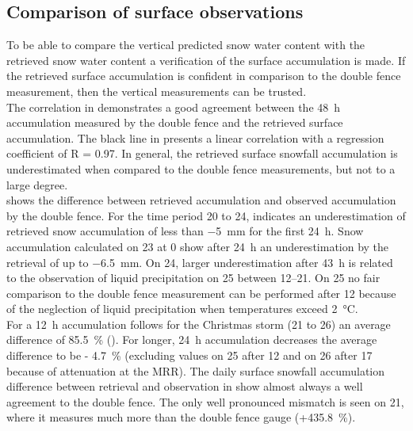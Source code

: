 %

\subsection{Comparison of surface observations} \label{sec:ret_dofe_comp}
To be able to compare the vertical predicted snow water content with the retrieved snow water content a verification of the surface accumulation is made. If the retrieved surface accumulation is confident in comparison to the double fence measurement, then the vertical measurements can be trusted.
\\
The correlation in  demonstrates a good agreement between the \SI{48}{\hour} accumulation measured by the double fence and the retrieved surface accumulation.
The black line in  presents a linear correlation with a regression coefficient of R = \num{0.97}. 
In general, the retrieved surface snowfall accumulation is underestimated when compared to the double fence measurements, but not to a large degree. 
\\
 shows the difference between retrieved accumulation and observed accumulation by the double fence. For the time period \num{20} to \SI{24}{\dec},  indicates an underestimation of retrieved snow accumulation of less than \SI{-5}{\mm} for the first \SI{24}{\hour}. 
Snow accumulation calculated on \SI{23}{\dec} at \SI{0}{\UTC} show after \SI{24}{\hour} an underestimation by the retrieval of up to \SI{-6.5}{\mm}. On \SI{24}{\dec}, larger underestimation after \SI{43}{\hour} is related to the observation of liquid precipitation on \SI{25}{\dec} between \SIrange{12}{21}{\UTC}. On \SI{25}{\dec} no fair comparison to the double fence measurement can be performed after \SI{12}{\UTC} because of the neglection of liquid precipitation when temperatures exceed \SI{2}{\celsius}.
\\
For a \SI{12}{\hour} accumulation follows for the Christmas storm (\num{21} to \SI{26}{\dec}) an average difference of \SI{85.5}{\percent} (). For longer, \SI{24}{\hour} accumulation decreases the average difference to be \SI{- 4.7}{\percent} (excluding values on \SI{25}{\dec} after \SI{12}{\UTC} and on \SI{26}{\dec} after \SI{17}{\UTC} because of attenuation at the MRR). The daily surface snowfall accumulation difference between retrieval and observation in  show almost always a well agreement to the double fence. The only well pronounced mismatch is seen on \SI{21}{\dec}, where it measures much more than the double fence gauge (+\SI{435.8}{\percent}).
